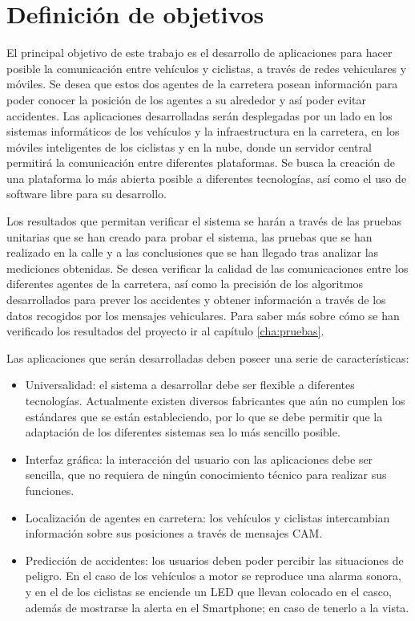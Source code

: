 \chapter{Definición de objetivos}
El principal objetivo de este trabajo es el desarrollo de aplicaciones para hacer
posible la comunicación entre vehículos y ciclistas, a través de redes vehiculares
y móviles. Se desea que estos dos agentes de la carretera posean información para
poder conocer la posición de los agentes a su alrededor y así poder evitar accidentes.
Las aplicaciones desarrolladas serán desplegadas por un lado en los sistemas
informáticos de los vehículos y la infraestructura en la carretera, en los móviles
inteligentes de los ciclistas y en la nube, donde un servidor central permitirá la
comunicación entre diferentes plataformas. Se busca la creación de una plataforma lo
más abierta posible a diferentes tecnologías, así como el uso de software libre para
su desarrollo.

Los resultados que permitan verificar el sistema se harán a través de las pruebas
unitarias que se han creado para probar el sistema, las pruebas que se han realizado
en la calle y a las conclusiones que se han llegado tras analizar las mediciones
obtenidas. Se desea verificar la calidad de las comunicaciones entre los diferentes
agentes de la carretera, así como la precisión de los algoritmos desarrollados para
prever los accidentes y obtener información a través de los datos recogidos por los
mensajes vehiculares. Para saber más sobre cómo se han verificado los resultados del
proyecto ir al capítulo \ref{cha:pruebas}.

Las aplicaciones que serán desarrolladas deben poseer una serie de características:
\begin{itemize}
	\item Universalidad: el sistema a desarrollar debe ser flexible a diferentes
	tecnologías. Actualmente existen diversos fabricantes que aún no cumplen los
	estándares que se están estableciendo, por lo que se debe permitir que la
	adaptación de los diferentes sistemas sea lo más sencillo posible.

	\item Interfaz gráfica: la interacción del usuario con las aplicaciones debe
	ser sencilla, que no requiera de ningún conocimiento técnico para realizar
	sus funciones.

	\item Localización de agentes en carretera: los vehículos y ciclistas
	intercambian información sobre sus posiciones a través de mensajes CAM.

	\item Predicción de accidentes: los usuarios deben poder percibir las situaciones
	de peligro. En el caso de los vehículos a motor se reproduce una alarma sonora, y
	en el de los ciclistas se enciende un LED que llevan colocado en el casco, además
	de mostrarse la alerta en el Smartphone; en caso de tenerlo a la vista.
\end{itemize}
